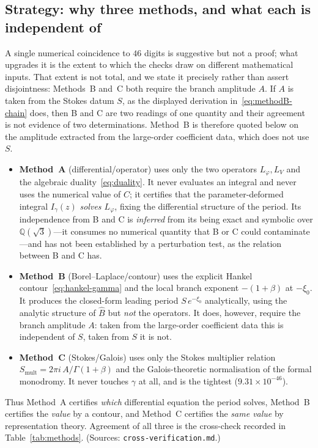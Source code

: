 \documentclass[11pt,reqno]{amsart}
\renewcommand{\_}{\vquadorigunderscore\allowbreak}
\theoremstyle{plain}
\theoremstyle{definition}
\newcommand{\Bhat}{\widehat{B}}
\newcommand{\Lphi}{L_{\varphi}}
\newcommand{\LV}{L_{V}}
\newcommand{\Qsqrt}{\mathbb{Q}(\sqrt3)}
\newcommand{\xizero}{\xi_0}
\providecommand{\C}{}\renewcommand{\C}{C}
\begin{document}
\subsection{Strategy: why three methods, and what each is independent of}\label{sub:strategy}
A single numerical coincidence to $46$ digits is suggestive but not a proof; what upgrades it is
the extent to which the checks draw on different mathematical inputs. That extent is not total,
and we state it precisely rather than assert disjointness: Methods~B and~C both require the
branch amplitude $A$. If $A$ is taken from the Stokes datum $S$, as the displayed derivation
in~\eqref{eq:methodB-chain} does, then B and C are two readings of one quantity and their
agreement is not evidence of two determinations. Method~B is therefore quoted below on the
amplitude extracted from the large-order coefficient data, which does not use $S$.
\begin{itemize}[leftmargin=1.6em]
\item \textbf{Method~A} (differential/operator) uses only the two operators $\Lphi,\LV$ and the
algebraic duality~\eqref{eq:duality}. It never evaluates an integral and never uses the numerical
value of $\C$; it certifies that the parameter-deformed integral $I_\gamma(z)$ \emph{solves
$\Lphi$}, fixing the differential structure of the period. Its independence from B and C is
\emph{inferred} from its being exact and symbolic over $\Qsqrt$---it consumes no numerical
quantity that B or C could contaminate---and has not been established by a perturbation test, as
the relation between B and C has.
\item \textbf{Method~B} (Borel--Laplace/contour) uses the explicit Hankel
contour~\eqref{eq:hankel-gamma} and the local branch exponent $-(1+\beta)$ at $-\xizero$. It
produces the closed-form leading period $S\,e^{-\xizero}$ analytically, using the analytic
structure of $\Bhat$ but \emph{not} the operators. It does, however, require the branch amplitude
$A$: taken from the large-order coefficient data this is independent of $S$, taken from $S$ it is
not.
\item \textbf{Method~C} (Stokes/Galois) uses only the Stokes multiplier relation
$S_{\mathrm{mult}}=2\pi i\,A/\Gamma(1+\beta)$ and the Galois-theoretic normalisation of the
formal monodromy. It never touches $\gamma$ at all, and is the tightest ($9.31\times10^{-46}$).
\end{itemize}
Thus Method~A certifies \emph{which} differential equation the period solves, Method~B certifies
the \emph{value} by a contour, and Method~C certifies the \emph{same value} by representation
theory. Agreement of all three is the cross-check recorded in Table~\ref{tab:methods}. (Sources:
\texttt{cross-verification.md}.)
\end{document}
